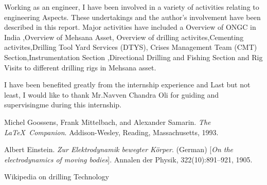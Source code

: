 \documentclass[113pt,a4paper]{report}
\makeatletter
\newcommand\mainmatter{%
    \cleardoublepage
  \pagenumbering{arabic}}
\makeatother
\begin{document}
\vspace{1em}

Working as  an engineer, I  have been  involved  in  a 
variety of activities  relating to engineering Aspects. 
These  undertakings  and the author's  involvement  have been  described  in 
this  report.   Major activities  have  included a Overview of ONGC in India ,Overview of Mehsana Asset,
Overview of drilling activites,Cementing activites,Drilling Tool Yard Services (DTYS),
Crises Management Team (CMT) Section,Instrumentation Section ,Directional Drilling and Fishing Section 
and Rig Visits to different drilling rigs in Mehsana asset.

\vspace{1em}

I have been benefited greatly  from the internship experience and Last but not least,
I would like to thank Mr.Navven Chandra Oli for guiding  and supervisingme during this internship. 

\newpage


\listoftables



\listoffigures



\mainmatter

\singlespacing























\begin{thebibliography}{9}

Michel Goossens, Frank Mittelbach, and Alexander Samarin. 
\textit{The \LaTeX\ Companion}. 
Addison-Wesley, Reading, Massachusetts, 1993.
 
Albert Einstein. 
\textit{Zur Elektrodynamik bewegter K{\"o}rper}. (German) 
[\textit{On the electrodynamics of moving bodies}]. 
Annalen der Physik, 322(10):891–921, 1905.
 
Wikipedia on drilling Technology



\end{thebibliography}
\end{document}
